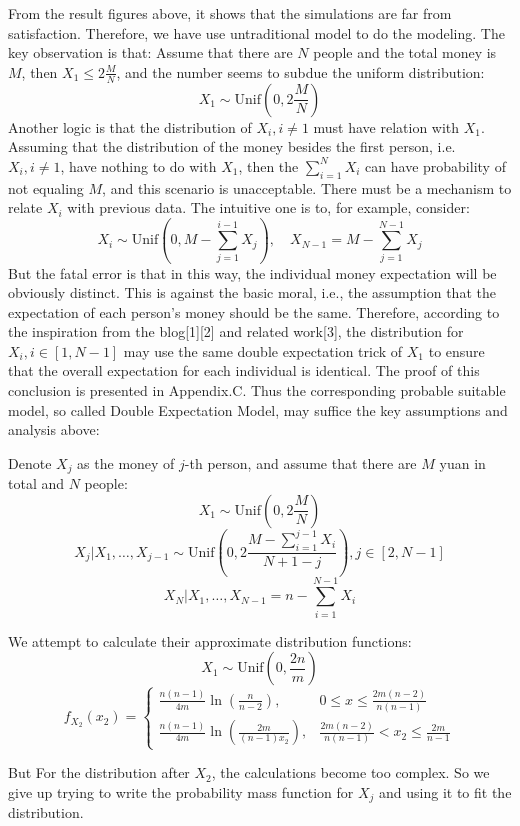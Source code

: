 \documentclass[11pt]{article}
\begin{document}
    From the result figures above, it shows that the simulations are far
from satisfaction. Therefore, we have use untraditional model to do the
modeling. The key observation is that: Assume that there are \(N\)
people and the total money is \(M\), then \(X_1 \leq 2\frac{M}{N}\), and
the number seems to subdue the uniform distribution:
\[
X_1 \sim \text{Unif}(0, 2\frac{M}{N})
\]
Another logic is that the distribution of \(X_i, i \neq 1\) must have
relation with \(X_1\). Assuming that the distribution of the money
besides the first person, i.e.~\(X_i, i \neq 1\), have nothing to do
with \(X_1\), then the \(\sum_{i=1}^N X_i\) can have probability of not
equaling \(M\), and this scenario is unacceptable. There must be a
mechanism to relate \(X_i\) with previous data. The intuitive one is to,
for example, consider:
\[
X_i \sim \text{Unif}(0, M-\sum_{j=1}^{i-1}X_j),\quad X_{N-1} = M - \sum_{j=1}^{N-1}X_j
\]
But the fatal error is that in this way, the individual money
expectation will be obviously distinct. This is against the basic moral,
i.e., the assumption that the expectation of each person's money should
be the same. Therefore, according to the inspiration from the
blog{[}1{]}{[}2{]} and related work{[}3{]}, the distribution for
\(X_i, i\in [1, N-1]\) may use the same double expectation trick of
\(X_1\) to ensure that the overall expectation for each individual is
identical. The proof of this conclusion is presented in Appendix.C. Thus
the corresponding probable suitable model, so called Double Expectation
Model, may suffice the key assumptions and analysis above:

Denote \(X_j\) as the money of \(j\)-th person, and assume that there
are \(M\) yuan in total and \(N\) people: \[
X_1 \sim \text{Unif}(0, 2\frac{M}{N})
\] \[
X_j | X_1, \dots, X_{j-1} \sim \text{Unif}(0, 2\frac{M-\sum_{i=1}^{j-1}X_i}{N+1-j}), j \in [2, N-1]
\] \[
X_N | X_1, \dots, X_{N-1} = n-\sum_{i=1}^{N-1} X_i
\]

We attempt to calculate their approximate distribution functions:
\[
X_1 \sim \text{Unif}\left(0, \frac{2n}{m}\right) 
\]
\[
f_{X_{2}}(x_2) =  
\begin{cases}  
\frac{n(n-1)}{4m} \ln\left(\frac{n}{n-2}\right), & 0 \leq x \leq \frac{2m(n-2)}{n(n-1)} \\
\frac{n(n-1)}{4m} \ln\left(\frac{2m}{(n-1)x_2}\right), & \frac{2m(n-2)}{n(n-1)} < x_2 \leq \frac{2m}{n-1}  
\end{cases}  
\]

But For the distribution after \(X_2\), the calculations become too
complex. So we give up trying to write the probability mass function for
\(X_j\) and using it to fit the distribution.
\end{document}
